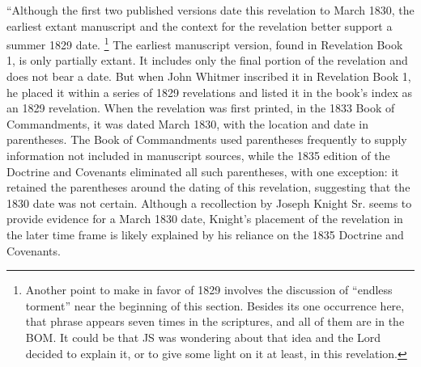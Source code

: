 			``Although the first two published versions date this revelation to March 1830, the earliest extant manuscript and the context for the revelation better support a summer 1829 date.%
				\footnote{%
					Another point to make in favor of 1829 involves the discussion of ``endless torment'' near the beginning of this section. Besides its one occurrence here, that phrase appears seven times in the scriptures, and all of them are in the BOM. It could be that JS was wondering about that idea and the Lord decided to explain it, or to give some light on it at least, in this revelation.
					}
			The earliest manuscript version, found in Revelation Book 1, is only partially extant. It includes only the final portion of the revelation and does not bear a date. But when John Whitmer inscribed it in Revelation Book 1, he placed it within a series of 1829 revelations and listed it in the book's index as an 1829 revelation. When the revelation was first printed, in the 1833 Book of Commandments, it was dated March 1830, with the location and date in parentheses. The Book of Commandments used parentheses frequently to supply information not included in manuscript sources, while the 1835 edition of the Doctrine and Covenants eliminated all such parentheses, with one exception: it retained the parentheses around the dating of this revelation, suggesting that the 1830 date was not certain. Although a recollection by Joseph Knight Sr. seems to provide evidence for a March 1830 date, Knight's placement of the revelation in the later time frame is likely explained by his reliance on the 1835 Doctrine and Covenants.%
